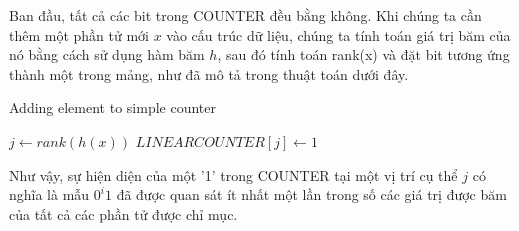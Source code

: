 \documentclass[a4paper,13pt]{article}
\theoremstyle{mytheor}
\begin{document}
Ban đầu, tất cả các bit trong COUNTER đều bằng không. Khi chúng ta cần thêm một phần tử mới $x$ vào cấu trúc dữ liệu, chúng ta tính toán 
giá trị băm của nó bằng cách sử dụng hàm băm $h$, sau đó tính toán rank(x) và đặt bit tương ứng thành một trong mảng, 
như đã mô tả trong thuật toán dưới đây.\\
\begin{algorithm}[H]
    \DontPrintSemicolon
    \LinesNumberedHidden
    \caption[]{Adding element to simple counter}
    $j \gets rank(h(x))$\;
    {
        $LINEARCOUNTER[j]\gets 1$
    }
\end{algorithm}
\vspace{0.4cm}
Như vậy, sự hiện diện của một '1' trong COUNTER tại một vị trí cụ thể $j$ có nghĩa là mẫu $0^i 1$ đã được quan sát ít nhất một lần 
trong số các giá trị được băm của tất cả các phần tử được chỉ mục.
\end{document}
